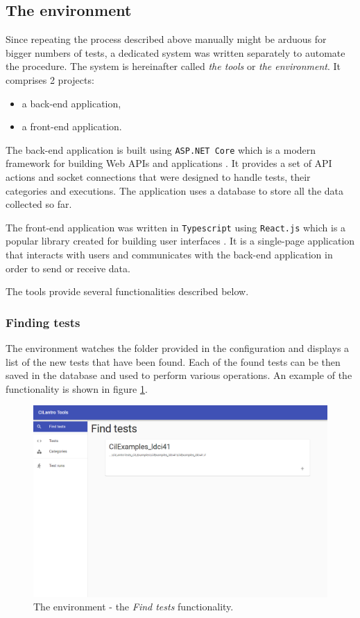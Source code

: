 \documentclass{article}
\numberwithin{equation}{section}
\begin{document}
\subsection{The environment}

Since repeating the process described above manually might be arduous for bigger numbers of tests, a dedicated system was written separately to automate the procedure. The system is hereinafter called \textit{the tools} or \textit{the environment}. It comprises 2 projects:
\begin{itemize}
	\item{a back-end application,}
	\item{a front-end application.}
\end{itemize}

The back-end application is built using \texttt{ASP.NET Core} which is a modern framework for building Web APIs and applications \cite{littleAsp}. It provides a set of API actions and socket connections that were designed to handle tests, their categories and executions. The application uses a database to store all the data collected so far.

The front-end application was written in \texttt{Typescript} using \texttt{React.js} which is a popular library created for building user interfaces \cite{learningReact}. It is a single-page application that interacts with users and communicates with the back-end application in order to send or receive data.

The tools provide several functionalities described below.

\subsubsection{Finding tests}

The environment watches the folder provided in the configuration and displays a list of the new tests that have been found. Each of the found tests can be then saved in the database and used to perform various operations. An example of the functionality is shown in figure \ref{fig:tools_find}.

\begin{figure}
	\includegraphics[width=1\textwidth]{tools_find.png}
    \centering
    \caption{The environment - the \textit{Find tests} functionality.}
    \label{fig:tools_find}
\end{figure}
\end{document}
